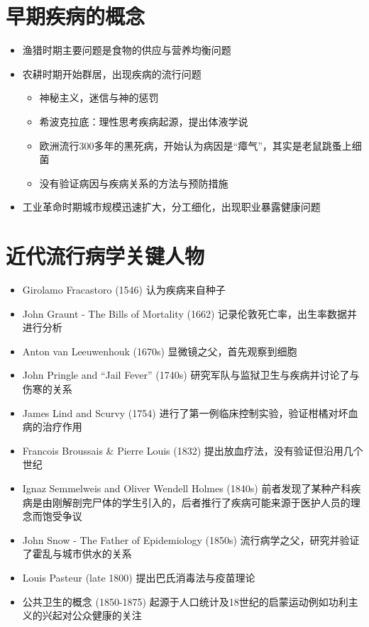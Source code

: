 \documentclass[
]{book}
\providecommand{\tightlist}{%
  \setlength{\itemsep}{0pt}\setlength{\parskip}{0pt}}
\begin{document}
\hypertarget{ux65e9ux671fux75beux75c5ux7684ux6982ux5ff5}{%
\section{早期疾病的概念}\label{ux65e9ux671fux75beux75c5ux7684ux6982ux5ff5}}

\begin{itemize}
\tightlist
\item
  渔猎时期主要问题是食物的供应与营养均衡问题
\item
  农耕时期开始群居，出现疾病的流行问题

  \begin{itemize}
  \tightlist
  \item
    神秘主义，迷信与神的惩罚
  \item
    希波克拉底：理性思考疾病起源，提出体液学说
  \item
    欧洲流行300多年的黑死病，开始认为病因是``瘴气''，其实是老鼠跳蚤上细菌
  \item
    没有验证病因与疾病关系的方法与预防措施
  \end{itemize}
\item
  工业革命时期城市规模迅速扩大，分工细化，出现职业暴露健康问题
\end{itemize}

\hypertarget{ux8fd1ux4ee3ux6d41ux884cux75c5ux5b66ux5173ux952eux4ebaux7269}{%
\section{近代流行病学关键人物}\label{ux8fd1ux4ee3ux6d41ux884cux75c5ux5b66ux5173ux952eux4ebaux7269}}

\begin{itemize}
\tightlist
\item
  Girolamo Fracastoro (1546) 认为疾病来自种子
\item
  John Graunt - The Bills of Mortality (1662) 记录伦敦死亡率，出生率数据并进行分析
\item
  Anton van Leeuwenhouk (1670s) 显微镜之父，首先观察到细胞
\item
  John Pringle and ``Jail Fever'' (1740s) 研究军队与监狱卫生与疾病并讨论了与伤寒的关系
\item
  James Lind and Scurvy (1754) 进行了第一例临床控制实验，验证柑橘对坏血病的治疗作用
\item
  Francois Broussais \& Pierre Louis (1832) 提出放血疗法，没有验证但沿用几个世纪
\item
  Ignaz Semmelweis and Oliver Wendell Holmes (1840s) 前者发现了某种产科疾病是由刚解剖完尸体的学生引入的，后者推行了疾病可能来源于医护人员的理念而饱受争议
\item
  John Snow - The Father of Epidemiology (1850s) 流行病学之父，研究并验证了霍乱与城市供水的关系
\item
  Louis Pasteur (late 1800) 提出巴氏消毒法与疫苗理论
\item
  公共卫生的概念 (1850-1875) 起源于人口统计及18世纪的启蒙运动例如功利主义的兴起对公众健康的关注
\end{itemize}
\end{document}

